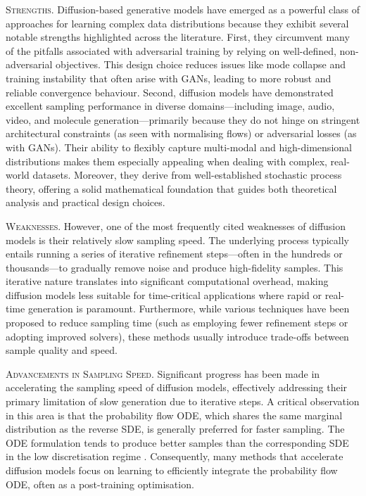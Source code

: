 \textsc{Strengths.} Diffusion-based generative models have emerged as a powerful class of approaches for learning complex data distributions because they exhibit several notable strengths highlighted across the literature. First, they circumvent many of the pitfalls associated with adversarial training by relying on well-defined, non-adversarial objectives. This design choice reduces issues like mode collapse and training instability that often arise with GANs, leading to more robust and reliable convergence behaviour. Second, diffusion models have demonstrated excellent sampling performance in diverse domains—including image, audio, video, and molecule generation—primarily because they do not hinge on stringent architectural constraints (as seen with normalising flows) or adversarial losses (as with GANs). Their ability to flexibly capture multi-modal and high-dimensional distributions makes them especially appealing when dealing with complex, real-world datasets. Moreover, they derive from well-established stochastic process theory, offering a solid mathematical foundation that guides both theoretical analysis and practical design choices.

\textsc{Weaknesses.} However, one of the most frequently cited weaknesses of diffusion models is their relatively slow sampling speed. The underlying process typically entails running a series of iterative refinement steps—often in the hundreds or thousands—to gradually remove noise and produce high-fidelity samples. This iterative nature translates into significant computational overhead, making diffusion models less suitable for time-critical applications where rapid or real-time generation is paramount. Furthermore, while various techniques have been proposed to reduce sampling time (such as employing fewer refinement steps or adopting improved solvers), these methods usually introduce trade-offs between sample quality and speed.

\textsc{Advancements in Sampling Speed.} Significant progress has been made in accelerating the sampling speed of diffusion models, effectively addressing their primary limitation of slow generation due to iterative steps. A critical observation in this area is that the probability flow ODE, which shares the same marginal distribution as the reverse SDE, is generally preferred for faster sampling. The ODE formulation tends to produce better samples than the corresponding SDE in the low discretisation regime \cite{song2020score}. Consequently, many methods that accelerate diffusion models focus on learning to efficiently integrate the probability flow ODE, often as a post-training optimisation.

